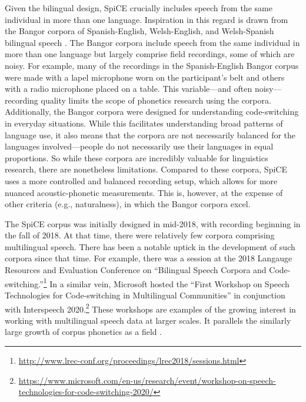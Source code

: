 Given the bilingual design, SpiCE crucially includes speech from the same individual in more than one language. Inspiration in this regard is drawn from the Bangor corpora of Spanish-English, Welsh-English, and Welsh-Spanish bilingual speech \citep{deuchar_2014_corpora}. The Bangor corpora include speech from the same individual in more than one language but largely comprise field recordings, some of which are noisy. For example, many of the recordings in the Spanish-English Bangor corpus were made with a lapel microphone worn on the participant's belt and others with a radio microphone placed on a table. This variable---and often noisy---recording quality limits the scope of phonetics research using the corpora. Additionally, the Bangor corpora were designed for understanding code-switching in everyday situations. While this facilitates understanding broad patterns of language use, it also means that the corpora are not necessarily balanced for the languages involved---people do not necessarily use their languages in equal proportions. So while these corpora are incredibly valuable for linguistics research, there are nonetheless limitations. Compared to these corpora, SpiCE uses a more controlled and balanced recording setup, which allows for more nuanced acoustic-phonetic measurements. This is, however, at the expense of other criteria (e.g., naturalness), in which the Bangor corpora excel.

The SpiCE corpus was initially designed in mid-2018, with recording beginning in the fall of 2018. At that time, there were relatively few corpora comprising multilingual speech. There has been a notable uptick in the development of such corpora since that time. For example, there was a session at the 2018 Langauge Resources and Evaluation Conference on ``Bilingual Speech Corpora and Code-switching.''\footnote{\url{http://www.lrec-conf.org/proceedings/lrec2018/sessions.html}} In a similar vein, Microsoft hosted the ``First Workshop on Speech Technologies for Code-switching in Multilingual Communities'' in conjunction with Interspeech 2020.\footnote{\url{https://www.microsoft.com/en-us/research/event/workshop-on-speech-technologies-for-code-switching-2020/}} These workshops are examples of the growing interest in working with multilingual speech data at larger scales. It parallels the similarly large growth of corpus phonetics as a field \citep{liberman_2019_corpus,grieve_2021_observation}.

